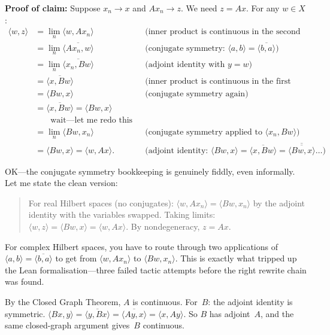\textbf{Proof of claim:} Suppose $x_n \to x$ and $Ax_n \to z$. We
need $z = Ax$. For any $w \in X$:
\begin{align*}
  \langle w, z \rangle
  &= \lim_n \langle w, Ax_n \rangle
  &\text{(inner product is continuous in the second variable)} \\
  &= \lim_n \overline{\langle Ax_n, w \rangle}
  &\text{(conjugate symmetry: $\langle a, b \rangle = \overline{\langle b, a \rangle}$)} \\
  &= \lim_n \overline{\langle x_n, Bw \rangle}
  &\text{(adjoint identity with $y = w$)} \\
  &= \overline{\langle x, Bw \rangle}
  &\text{(inner product is continuous in the first variable)} \\
  &= \langle Bw, x \rangle
  &\text{(conjugate symmetry again)} \\
  &= \overline{\langle x, Bw \rangle} = \langle Bw, x \rangle \\
  &\quad\;\;\; \text{wait---let me redo this without the double flip} \\[4pt]
  &= \lim_n \langle Bw, x_n \rangle
  &\text{(conjugate symmetry applied to $\langle x_n, Bw \rangle$)} \\
  &= \langle Bw, x \rangle = \langle w, Ax \rangle.
  &\text{(adjoint identity: $\langle Bw, x \rangle = \overline{\langle x, Bw \rangle} = \overline{\overline{\langle Bw, x \rangle}} \ldots$)}
\end{align*}

OK---the conjugate symmetry bookkeeping is genuinely fiddly, even
informally. Let me state the clean version:

\begin{quote}
For real Hilbert spaces (no conjugates): $\langle w, Ax_n \rangle =
\langle Bw, x_n \rangle$ by the adjoint identity with the variables
swapped. Taking limits: $\langle w, z \rangle = \langle Bw, x \rangle
= \langle w, Ax \rangle$. By nondegeneracy, $z = Ax$.
\end{quote}

For complex Hilbert spaces, you have to route through two applications of
$\langle a, b \rangle = \overline{\langle b, a \rangle}$ to get from
$\langle w, Ax_n \rangle$ to $\langle Bw, x_n \rangle$. This is exactly
what tripped up the Lean formalisation---three failed tactic attempts
before the right rewrite chain was found.

By the Closed Graph Theorem, $A$ is continuous. For~$B$: the adjoint
identity is symmetric. $\langle Bx, y \rangle = \overline{\langle y,
Bx \rangle} = \overline{\langle Ay, x \rangle} = \langle x, Ay \rangle$.
So $B$ has adjoint~$A$, and the same closed-graph argument gives~$B$
continuous.

